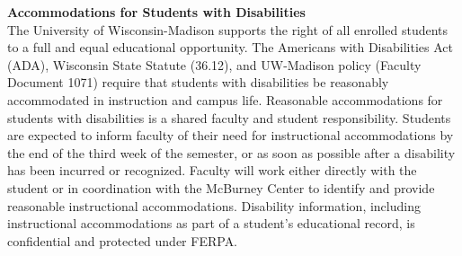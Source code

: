 \documentclass[11pt,oneside]{amsart}
\newcommand{\header}[1]{\bigbreak\textbf{#1}}
\begin{document}
\header{Accommodations for Students with Disabilities}\\
The University of Wisconsin-Madison supports the right of all enrolled students to a full and equal educational opportunity. The Americans with Disabilities Act (ADA), Wisconsin State Statute (36.12), and UW-Madison policy (Faculty Document 1071) require that students with disabilities be reasonably accommodated in instruction and campus life. Reasonable accommodations for students with disabilities is a shared faculty and student responsibility. Students are expected to inform faculty of their need for instructional accommodations by the end of the third week of the semester, or as soon as possible after a disability has been incurred or recognized. Faculty will work either directly with the student or in coordination with the McBurney Center to identify and provide reasonable instructional accommodations. Disability information, including instructional accommodations as part of a student's educational record, is confidential and protected under FERPA.
\end{document}
